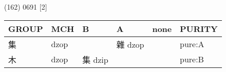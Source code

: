 \documentclass[14pt,a4paper]{scrartcl}
\begin{document}
(162) 0691 {[}2{]}

\begin{longtable}[c]{@{}llllll@{}}
\toprule
\begin{minipage}[b]{0.14\columnwidth}\raggedright\strut
GROUP
\strut\end{minipage} &
\begin{minipage}[b]{0.14\columnwidth}\raggedright\strut
MCH
\strut\end{minipage} &
\begin{minipage}[b]{0.14\columnwidth}\raggedright\strut
B
\strut\end{minipage} &
\begin{minipage}[b]{0.14\columnwidth}\raggedright\strut
A
\strut\end{minipage} &
\begin{minipage}[b]{0.14\columnwidth}\raggedright\strut
none
\strut\end{minipage} &
\begin{minipage}[b]{0.14\columnwidth}\raggedright\strut
PURITY
\strut\end{minipage}\tabularnewline
\midrule
\endhead
\begin{minipage}[t]{0.14\columnwidth}\raggedright\strut
集
\strut\end{minipage} &
\begin{minipage}[t]{0.14\columnwidth}\raggedright\strut
dzop
\strut\end{minipage} &
\begin{minipage}[t]{0.14\columnwidth}\raggedright\strut
\strut\end{minipage} &
\begin{minipage}[t]{0.14\columnwidth}\raggedright\strut
雜 dzop
\strut\end{minipage} &
\begin{minipage}[t]{0.14\columnwidth}\raggedright\strut
\strut\end{minipage} &
\begin{minipage}[t]{0.14\columnwidth}\raggedright\strut
pure:A
\strut\end{minipage}\tabularnewline
\begin{minipage}[t]{0.14\columnwidth}\raggedright\strut
木
\strut\end{minipage} &
\begin{minipage}[t]{0.14\columnwidth}\raggedright\strut
dzop
\strut\end{minipage} &
\begin{minipage}[t]{0.14\columnwidth}\raggedright\strut
集 dzip
\strut\end{minipage} &
\begin{minipage}[t]{0.14\columnwidth}\raggedright\strut
\strut\end{minipage} &
\begin{minipage}[t]{0.14\columnwidth}\raggedright\strut
\strut\end{minipage} &
\begin{minipage}[t]{0.14\columnwidth}\raggedright\strut
pure:B
\strut\end{minipage}\tabularnewline
\bottomrule
\end{longtable}
\end{document}
